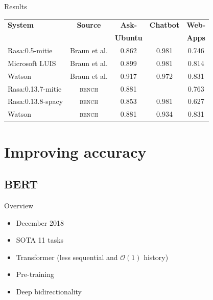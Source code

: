 \documentclass[pdf]{beamer}
\begin{document}
    \begin{frame}{Results}
        \hspace*{-6mm}
        \begin{tabular}{l c c c c}
            \textbf{System} & \textbf{Source} & \textbf{Ask-} & \textbf{Chatbot} & \textbf{Web-} \\
            & & \textbf{Ubuntu} & & \textbf{Apps} \\
            \hline
            Rasa:0.5-mitie & Braun et al. & 0.862 & 0.981 & 0.746 \\
            Microsoft LUIS & Braun et al. & 0.899 & 0.981 & 0.814 \\
            Watson & Braun et al. & 0.917 & 0.972 & 0.831 \\
            Rasa:0.13.7-mitie & \textsc{bench} & 0.881 & & 0.763 \\
            Rasa:0.13.8-spacy & \textsc{bench} & 0.853 & 0.981 & 0.627 \\
            Watson & \textsc{bench} & 0.881 & 0.934 & 0.831 \\
            \hline
        \end{tabular}
    \end{frame}

    \section{Improving accuracy}

    \subsection{BERT}
    \begin{frame}{Overview}
        \begin{itemize}
            \item December 2018
            \item SOTA 11 tasks\\[5mm]

            \item Transformer (less sequential and $\mathcal{O} (1)$ history)
            \item Pre-training
            \item Deep bidirectionality
        \end{itemize}
    \end{frame}
\end{document}
